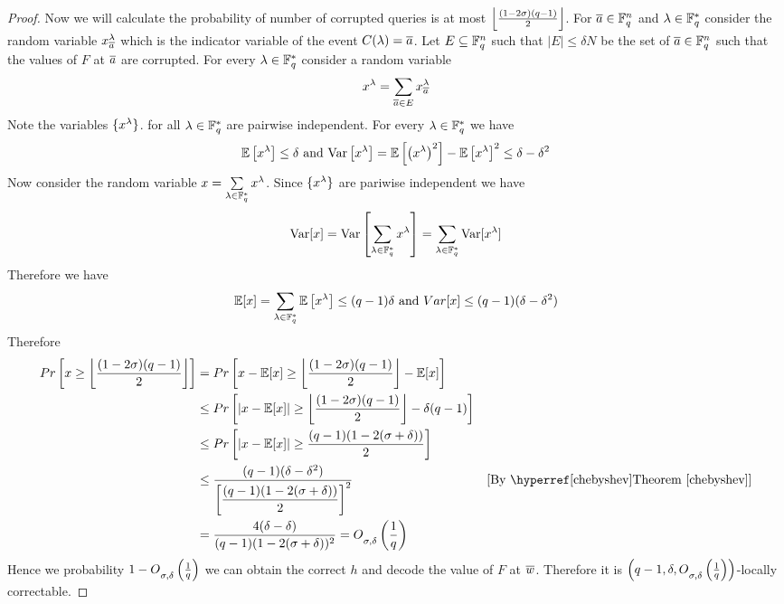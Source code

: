 \begin{proof}
	Now we will calculate the probability of number of corrupted queries is at most $\left\lfloor \frac{(1-2\sigma)(q-1)}2\right\rfloor$. For $\overline{a}\in \mathbb{F}_q^n$ and $\lambda\in \mathbb{F}^*_q$ consider the random variable $x_{\overline{a}}^{\lambda}$ which is the indicator variable of the event $C(\lambda)=\overline{a}$. Let $E\subseteq \mathbb{F}_q^n$ such that $|E|\leq \delta N$ be the set of $\overline{a}\in \mathbb{F}_q^n$ such that the values of $F$ at $\overline{a}$ are corrupted. For every $\lambda\in \mathbb{F}_q^*$ consider a random variable $$x^{\lambda}=\sum_{\overline{a}\in E}x^{\lambda}_{\overline{a}}$$Note the variables $\{x^{\lambda}\}$. for all $\lambda\in \mathbb{F}_q^*$ are pairwise independent. For every $\lambda\in \mathbb{F}^*_q$ we have $$\mathbb{E}\left[x^{\lambda}\right]\leq \delta\text{ and }\text{Var}\left[x^{\lambda}\right]=\mathbb{E}\left[\left(x^{\lambda}\right)^2\right]-\mathbb{E}\left[x^{\lambda}\right]^2\leq \delta-\delta^2$$Now consider the random variable $x=\sum\limits_{\lambda\in \mathbb{F}_q^*}x^{\lambda}$. Since $\{x^{\lambda}\}$ are pariwise independent we have $$\text{Var}[x]=\text{Var}\left[\sum_{\lambda\in\mathbb{F}^*_q}x^{\lambda}\right]=\sum_{\lambda\in\mathbb{F}_q^*}\text{Var}[x^{\lambda}]$$Therefore we have $$\mathbb{E}[x]=\sum_{\lambda\in\mathbb{F}_q^*}\mathbb{E}\left[x^{\lambda}\right]\leq (q-1)\delta\text{ and }Var[x]\leq  (q-1)(\delta-\delta^2)$$Therefore \begin{align*}
		Pr\lt[  x\geq  \lt\lfloor \frac{(1-2\sg)(q-1)}2\rt\rfloor\rt] & = Pr\lt[ x-\bbE[x]\geq \lt\lfloor \frac{(1-2\sg)(q-1)}2\rt\rfloor - \bbE[x] \rt]\\
		& \leq Pr\lt[ |x-\bbE[x]|\geq \lt\lfloor \frac{(1-2\sg)(q-1)}2\rt\rfloor-\delta(q-1) \rt]\\
		& \leq Pr\lt[|x-\bbE[x]|\geq \frac{(q-1)(1-2(\sg+\delta))}2\rt]\\
		& \leq \frac{(q-1)(\delta-\delta^2)}{\lt[\dfrac{(q-1)(1-2(\sg+\delta))}2\rt]^2} & [\text{By \thmref{chebyshev}}]\\
		& = \frac{4(\delta-\delta)}{(q-1)(1-2(\sg+\delta))^2}=O\st_{\sg,\delta}\lt(\frac1q\rt)
	\end{align*}
	Hence we probability $1-O\strut_{\sigma,\delta}\left(\frac1q\right)$ we can obtain the correct $h$ and decode the value of $F$ at $\overline{w}$. Therefore it is $\left( q-1,\delta,O\strut_{\sigma,\delta}\left(\frac1q\right)\right)$-locally correctable.
\end{proof}
